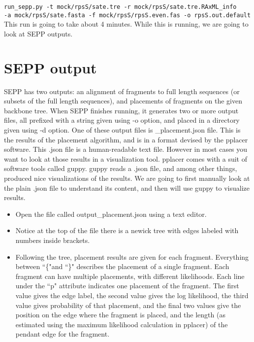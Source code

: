 \documentclass[11pt]{article} %
\newcommand{\sepp}{SEPP\xspace}
\newcommand{\ins}[1]{{\tt #1}}
\newcommand{\file}[1]{{\sf #1}}
\newcommand{\pplacer}{pplacer\xspace}
\newcommand{\guppy}{guppy\xspace}
\begin{document}
\ins{run\_sepp.py -t mock/rpsS/sate.tre -r mock/rpsS/sate.tre.RAxML\_info \\ -a mock/rpsS/sate.fasta -f mock/rpsS/rpsS.even.fas -o rpsS.out.default}\\

This run is going to take about 4 minutes. While this is running, we are going to look at \sepp outputs. 

\section{\sepp output }
\sepp has two outputs: an alignment of fragments to full length sequences (or subsets of the full length sequences), and placements of fragments on the given backbone tree. When \sepp finishes running, it generates two or more output files, all prefixed with a string given using -o option, and placed in a directory given using -d option. One of these output files is \file{[prefix]\_placement.json} file. This is the results of the placement algorithm, and is in a format devised by the \pplacer software. This .json file is a human-readable text file. However in most cases you want to look at those results in a visualization tool. \pplacer comes with a suit of software tools called \guppy. \guppy reads a \file{.json} file, and among other things, produced nice visualizations of the results. We are going to first manually look at the plain \file{.json} file to understand its content, and then will use \guppy to visualize results.   

\begin{itemize}
\item Open the file called \file{output\_placement.json} using a text editor. 
\item Notice at the top of the file there is a newick tree with edges labeled with numbers inside brackets. 
\item Following the tree, placement results 
are given for each fragment.  Everything between ``\{"and ``\}" 
describes the placement of a single fragment. Each fragment can have multiple placements, with different likelihoods. Each line under the ``p" attribute indicates one placement of the fragment. The first value gives the edge label, the second value gives the log likelihood, the third value gives probability of that placement, and the final two values give the position on the edge where the fragment is placed, and the 
length (as estimated using the maximum likelihood
calculation in pplacer)
 of the pendant edge for the fragment.
\end{itemize}
\end{document}

